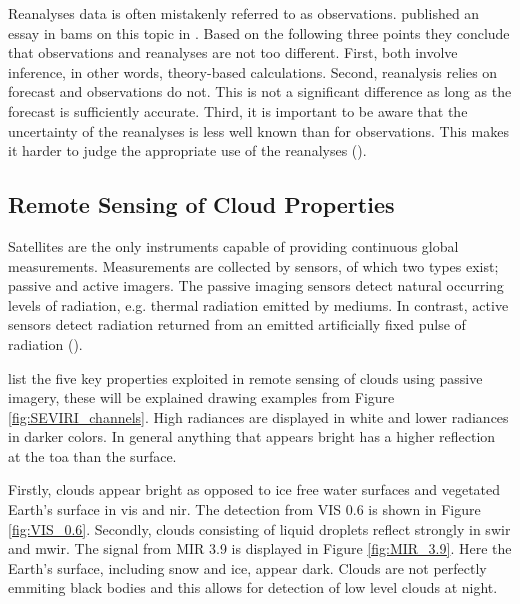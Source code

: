Reanalyses data is often mistakenly referred to as observations. \citeauthor{Parker2016ReanalysesDifference} published an essay in \acrfull{bams} on this topic in \citeyear{Parker2016ReanalysesDifference}. Based on the following three points they conclude that observations and reanalyses are not too different. First, both involve inference, in other words, theory-based calculations. Second, reanalysis relies on forecast and observations do not. This is not a significant difference as long as the forecast is sufficiently accurate. Third, it is important to be aware that the uncertainty of the reanalyses is less well known than for observations. This makes it harder to judge the appropriate use of the reanalyses (\cite{Parker2016ReanalysesDifference}). 

\subsection{Remote Sensing of Cloud Properties}
Satellites are the only instruments capable of providing continuous global measurements.
Measurements are collected by sensors, of which two types exist; passive and active imagers. The passive imaging sensors detect natural occurring levels of radiation, e.g. thermal radiation emitted by mediums. In contrast, active sensors  detect radiation returned from an emitted artificially fixed pulse of radiation (\cite{Stephens2018CloudsatSystem}).


 list the five key properties exploited in remote sensing of clouds using passive imagery, these will be explained drawing examples from Figure \ref{fig:SEVIRI_channels}. High radiances are displayed in white and lower radiances in darker colors. In general anything that appears bright has a higher reflection at the \acrshort{toa} than the surface. 

Firstly, clouds appear bright as opposed to ice free water surfaces and vegetated Earth's surface in \acrfull{vis} and \acrfull{nir}. The detection from VIS 0.6 is shown in Figure \ref{fig:VIS_0.6}. Secondly, clouds consisting of liquid droplets reflect strongly in \acrfull{swir} and \acrfull{mwir}. The signal from MIR 3.9 is displayed in Figure \ref{fig:MIR_3.9}. Here the Earth's surface, including snow and ice, appear dark. Clouds are not perfectly emmiting black bodies and this allows for detection of low level clouds at night.

